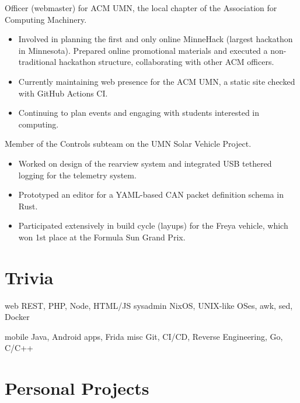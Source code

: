 \documentclass{moderncv}
\begin{document}
{
  Officer (webmaster) for ACM UMN, the local chapter of the Association for Computing Machinery.
  \begin{itemize}[label=\textbullet,noitemsep]
  \item Involved in planning the first and only online MinneHack (largest hackathon in Minnesota). Prepared online promotional materials and executed a non-traditional hackathon structure, collaborating with other ACM officers.
  \item Currently maintaining web presence for the ACM UMN, a static site checked with GitHub Actions CI.
  \item Continuing to plan events and engaging with students interested in computing.
  \end{itemize}
}

{
  Member of the Controls subteam on the UMN Solar Vehicle Project.
  \begin{itemize}[label=\textbullet,noitemsep]
  \item Worked on design of the rearview system and integrated USB tethered logging for the telemetry system.
  \item Prototyped an editor for a YAML-based CAN packet definition schema in Rust.
  \item Participated extensively in build cycle (layups) for the Freya vehicle, which won 1st place at the Formula Sun Grand Prix.
  \end{itemize}
}

\section{Trivia}

\cvdoubleitem
{web}
{
  REST, PHP, Node, HTML/JS
}
{sysadmin}
{
  NixOS, UNIX-like OSes, awk, sed, Docker
}

\cvdoubleitem
{mobile}
{
  Java, Android apps, Frida
}
{misc}
{
  Git, CI/CD, Reverse Engineering, Go, C/C++
}

\section{Personal Projects}
\end{document}
